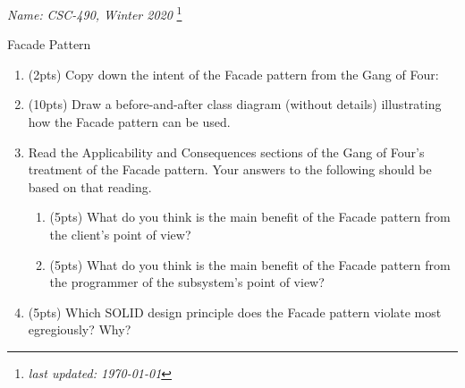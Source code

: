 \documentclass[11pt]{article}
\newlength{\up}\setlength{\up}{-\baselineskip}
\newcommand\blfootnote[1]{%
  \begingroup
  \renewcommand\thefootnote{}\footnote{#1}%
  \addtocounter{footnote}{-1}%
  \endgroup
}
\begin{document}
\noindent\emph{Name:}
\hfill
\emph{CSC-490, Winter 2020}
\blfootnote{\emph{last updated: \today}}

\vspace{-0.4in}

\begin{center}
  {\huge Facade Pattern}
\end{center}

\medskip




\begin{enumerate}

    \item (2pts) Copy down the intent of the Facade pattern from the Gang of Four:

    \vspace{0.5in}

    \item (10pts) Draw a before-and-after class diagram (without details) illustrating how the Facade pattern can be used. 

    \vfill
    \vfill
    \vfill

    \item Read the Applicability and Consequences sections of the Gang of Four's treatment of the Facade pattern. Your answers to the following should be based on that reading.

    \begin{enumerate}

      \item (5pts) What do you think is the main benefit of the Facade pattern from the client's point of view?

      \vfill

      \item (5pts) What do you think is the main benefit of the Facade pattern from the programmer of the subsystem's point of view?

      \vfill

    \end{enumerate}


    \item (5pts) Which SOLID design principle does the Facade pattern violate most egregiously? Why?

    \vfill
 

\end{enumerate}
\end{document}
